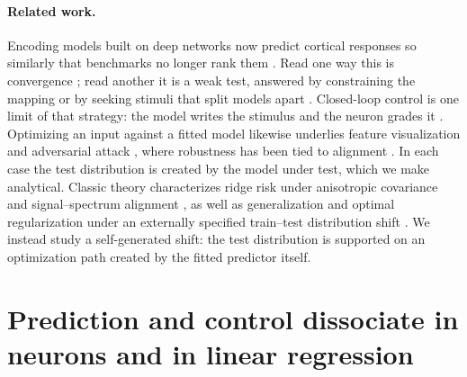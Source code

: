 \paragraph{Related work.}
Encoding models built on deep networks now predict cortical responses so similarly that benchmarks no longer rank them \citep{yamins2014performanceOptimized,guclu2015deepGradientComplexity,cadena2019deepConvolutionalV1,schrimpf2018brainscore,conwell2024inductiveBiases}. Read one way this is convergence \citep{huh2024platonicRepresentationHypothesis,kapoor2026convergentLearning}; read another it is a weak test, answered by constraining the mapping \citep{prince2024sparsePositiveAlignment} or by seeking stimuli that split models apart \citep{golan2020controversialStimuli,feather2023modelMetamers,rajalingham2018large,geirhos2019imagenetTextureBias}. Closed-loop control is one limit of that strategy: the model writes the stimulus and the neuron grades it \citep{ponce2019evolvingImages,xiao2020xdream,bashivan2019neuralPopulationControl,walker2019inceptionLoops,prince2026parametric}. Optimizing an input against a fitted model likewise underlies feature visualization \citep{olah2017feature,hamblin2024feature,fel2023magnitudeConstrainedOptimization} and adversarial attack \citep{nguyen2015deepNeuralFooled,goodfellow2015explainingAdversarial,madry2018towardsResistant}, where robustness has been tied to alignment \citep{guo2022adversariallyTrainedNeuralRepresentations,dapello2020simulatingV1,taori2020measuring}.
In each case the test distribution is created by the model under test, which we make analytical.
Classic theory characterizes ridge risk under anisotropic covariance and signal--spectrum alignment \citep{dobriban2018high,hastie2022surprises,mei2022generalization,mel2021highDimensionalRegression}, as well as generalization and optimal regularization under an externally specified train--test distribution shift \citep{canatar2021outOfDistribution,tripuraneni2021covariateShift,patil2024optimalOODRidge}. We instead study a self-generated shift: the test distribution is supported on an optimization path created by the fitted predictor itself.

\section{Prediction and control dissociate in neurons and in linear regression}
\label{sec:phenomena}

